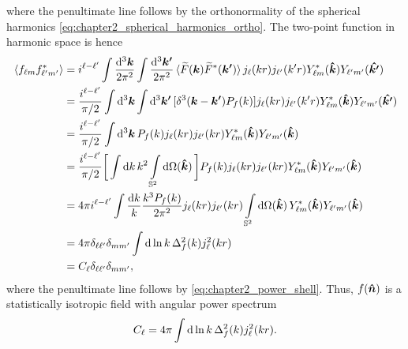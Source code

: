 %
where the penultimate line follows by the orthonormality of the spherical harmonics \cref{eq:chapter2_spherical_harmonics_ortho}.
The two-point function in harmonic space is hence
%
\begin{align}
	\expval*{\harmonic{f}\conj{\harmonic[']{f}}}
	 & = i^{\ell-\ell'} \int\frac{\dd[3]{\vb*{k}}}{2\pi^{2}} \int\frac{\dd[3]{\vb*{k'}}}{2\pi^{2}} \expval*{\fourier{F}(\vb*{k}) \conj{\fourier{F}}(\vb*{k'})} \bessel{k r} \bessel[']{k'r} \conj{\harmonic{Y}}(\vu*{k}) \harmonic[']{Y}(\vu*{k'}) \nonumber{} \\
	 & = \frac{i^{\ell-\ell'}}{\pi/2} \int\dd[3]{\vb*{k}} \int\dd[3]{\vb*{k'}} [\delta^{3}(\vb*{k} - \vb*{k'}) \powerSpectrumDim{f}] \bessel{k r} \bessel[']{k'r} \conj{\harmonic{Y}}(\vu*{k}) \harmonic[']{Y}(\vu*{k'}) \nonumber{}                           \\
	 & = \frac{i^{\ell-\ell'}}{\pi/2} \int\dd[3]{\vb*{k}} \powerSpectrumDim{f} \bessel{k r} \bessel[']{k r} \conj{\harmonic{Y}}(\vu*{k}) \harmonic[']{Y}(\vu*{k}) \nonumber{}                                                                                  \\
	 & = \frac{i^{\ell-\ell'}}{\pi/2} \bigg[\int\dd{k} k^{2} \integrateSphere{\vu*{k}}\bigg] \powerSpectrumDim{f} \bessel{k r} \bessel[']{k r} \conj{\harmonic{Y}}(\vu*{k}) \harmonic[']{Y}(\vu*{k}) \nonumber{}                                               \\
	 & = 4\pi i^{\ell-\ell'} \int\frac{\dd{k}}{k} \frac{k^{3}\powerSpectrumDim{f}}{2\pi^{2}} \bessel{k r} \bessel[']{k r} \integrateSphere{\vu*{k}} \conj{\harmonic{Y}}(\vu*{k}) \harmonic[']{Y}(\vu*{k}) \nonumber{}                                          \\
	 & = 4\pi \delta_{\ell\ell'} \delta_{m m'} \int\dd{\ln{k}} \Delta_{f}^{2}(k) j^{2}_{\ell}(k r) \nonumber{}                                                                                                                                                 \\
	 & = \powerSpectrum \delta_{\ell\ell'} \delta_{m m'},
\end{align}
%
where the penultimate line follows by \cref{eq:chapter2_power_shell}.
Thus, \(f(\vu*{n})\) is a statistically isotropic field with angular power spectrum
%
\begin{equation}
	\powerSpectrum
	= 4\pi \int\dd{\ln{k}} \Delta_{f}^{2}(k) j^{2}_{\ell}(k r).
\end{equation}



